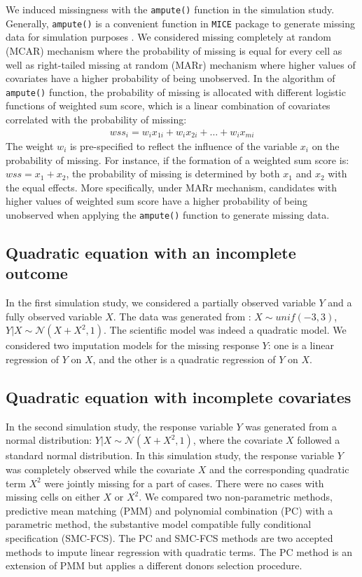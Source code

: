 	We induced missingness with the \texttt{ampute()} function in the simulation study. Generally, \texttt{ampute()} is a convenient function in \texttt{MICE} package to generate missing data for simulation purposes \citep{Schouten2018}. We considered missing completely at random (MCAR) mechanism where the probability of missing is equal for every cell as well as right-tailed missing at random (MARr) mechanism where higher values of covariates have a higher probability of being unobserved. In the algorithm of \texttt{ampute()} function, the probability of missing is allocated with different logistic functions of weighted sum score, which is a linear combination of covariates correlated with the probability of missing:
	\begin{equation}
		\begin{array}{ll}
			wss_{i} = w_{i}x_{1i} + w_{i}x_{2i} + \dots + w_{i}x_{mi}
		\end{array} 
	\end{equation}
	The weight $w_i$ is pre-specified to reflect the influence of the variable $x_{i}$ on the probability of missing. For instance, if the formation of a weighted sum score is:
	$wss = x_1 + x_2$, the probability of missing is determined by both $x_1$ and $x_2$ with the equal effects. More specifically, under MARr mechanism, candidates with higher values of weighted sum score have a higher probability of being unobserved when applying the \texttt{ampute()} function to generate missing data.
	
	\subsection{Quadratic equation with an incomplete outcome}
	In the first simulation study, we considered a partially observed variable $Y$ and a fully observed variable $X$. The data was generated from : $X \sim unif(-3, 3)$, $Y|X \sim \mathcal{N}(X + X^2, 1)$. The scientific model was indeed a quadratic model. We considered two imputation models for the missing response $Y$: one is a linear regression of $Y$ on $X$, and the other is a quadratic regression of $Y$ on $X$. 
	
	\subsection{Quadratic equation with incomplete covariates}
	In the second simulation study, the response variable $Y$ was generated from a normal distribution: $Y|X \sim \mathcal{N}(X + X^2, 1)$, where the covariate $X$ followed a standard normal distribution. In this simulation study, the response variable $Y$ was completely observed while the covariate $X$ and the corresponding quadratic term $X^2$ were jointly missing for a part of cases. There were no cases with missing cells on either $X$ or $X^2$. We compared two non-parametric methods, predictive mean matching (PMM) and polynomial combination (PC) with a parametric method, the substantive model compatible fully conditional specification (SMC-FCS). The PC and SMC-FCS methods are two accepted methods to impute linear regression with quadratic terms. The PC method is an extension of PMM but applies a different donors selection procedure. 
	
